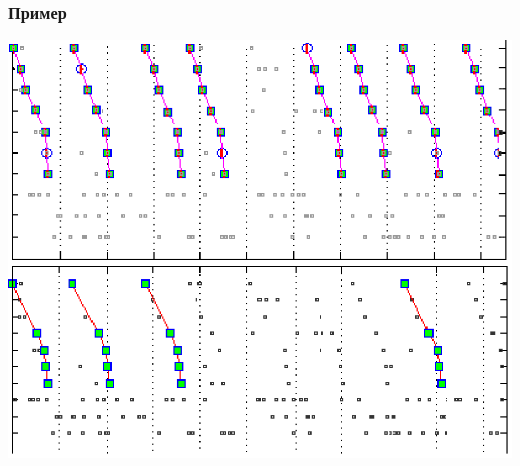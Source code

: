 \documentclass[smaller]{beamer}
\begin{document}
\begin{frame}
  \frametitle{ Пример }
       \includegraphics[scale=0.6]{comp.eps} 
\end{frame}
\end{document}
